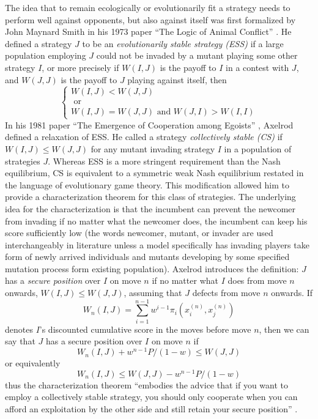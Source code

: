 The idea that to remain ecologically or evolutionarily fit a strategy needs to perform well against opponents, but also against itself was first formalized by John Maynard Smith in his 1973 paper ``The Logic of Animal Conflict'' \cite{MaynardSmith1973}. He defined a strategy $J$ to be an \textit{evolutionarily stable strategy (ESS)} if a large population employing $J$ could not be invaded by a mutant playing some other strategy $I$, or more precisely if $W(I, J)$ is the payoff to $I$ in a contest with $J$, and $W(J, J)$ is the payoff to $J$ playing against itself, then
\begin{equation} \label{eq:ESS}
\begin{cases} 
W(I, J) < W(J, J)\\
\textrm{ or}\\
W(I, J) = W(J, J) \textrm{ and } W(J, I) > W(I, I)
\end{cases}
\end{equation}
In his 1981 paper ``The Emergence of Cooperation among Egoists'' \cite{RobertAxelrod_1981}, Axelrod defined a relaxation of ESS. He called a strategy \textit{collectively stable (CS)} if $W(I, J) \leq W(J, J)$ for any mutant invading strategy $I$ in a population of strategies $J$. Whereas ESS is a more stringent requirement than the Nash equilibrium, CS is equivalent to a symmetric weak Nash equilibrium restated in the language of evolutionary game theory. This modification allowed him to provide a characterization theorem for this class of strategies. The underlying idea for the characterization is that the incumbent can prevent the newcomer from invading if no matter what the newcomer does, the incumbent can keep his score sufficiently low (the words newcomer, mutant, or invader are used interchangeably in literature unless a model specifically has invading players take form of newly arrived individuals and mutants developing by some specified mutation process form existing population). Axelrod introduces the definition: $J$ has a \textit{secure position} over $I$ on move $n$ if no matter what $I$ does from move $n$ onwards, $W(I,J) \leq W(J,J)$, assuming that $J$ defects from move $n$ onwards. If
\[
W_n(I,J) = \sum_{i=1}^{n-1} w^{i-1} \pi_i(x_i^{(n)}, x_j^{(n)})
\]
denotes $I$'s discounted cumulative score in the moves before move $n$, then we can say that $J$ has a secure position over $I$ on move $n$ if 
\[
W_n(I, J) + w^{n-1} P/(1-w) \leq W(J, J) 
\]
or equivalently
\begin{equation}\label{eq:secpos}
W_n(I, J) \leq  W(J, J) - w^{n-1} P/(1-w) 
\end{equation}
thus the characterization theorem ``embodies the advice that if you want to employ a collectively stable strategy, you should only cooperate when you can afford an exploitation by the other side and still retain your secure position'' \cite[p.313]{RobertAxelrod_1981}.

